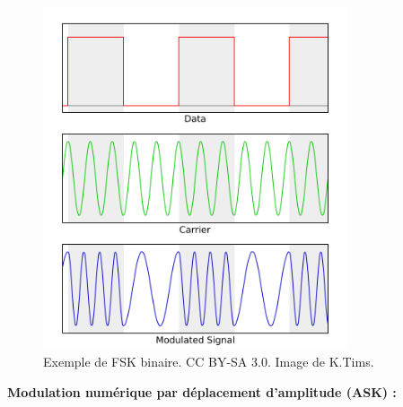 \begin{figure}[H] %
    \centering
    \includegraphics[width=0.8\textwidth]{figures/6-40.png}
    \caption{Exemple de FSK binaire. CC BY-SA 3.0. Image de K.Tims.}
    \label{fig:communication2}
\end{figure}
\textbf{Modulation numérique par déplacement d'amplitude (ASK) :}
